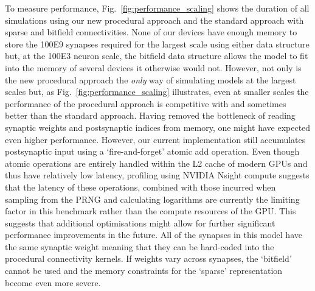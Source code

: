 \documentclass[9pt,a4paper]{amsart}
\begin{document}
To measure performance, Fig.~\ref{fig:performance_scaling} shows the duration of all simulations using our new procedural approach and the standard approach with sparse and bitfield connectivities. 
None of our devices have enough memory to store the \num{100E9} synapses required for the largest scale using either data structure but, at the \num{100E3} neuron scale, the bitfield data structure allows the model to fit into the memory of several devices it otherwise would not.
However, not only is the new procedural approach the \emph{only} way of simulating models at the largest scales but, as Fig.~\ref{fig:performance_scaling} illustrates, even at smaller scales the performance of the procedural approach is competitive with and sometimes better than the standard approach.
Having removed the bottleneck of reading synaptic weights and postsynaptic indices from memory, one might have expected even higher performance. 
However, our current implementation still accumulates postsynaptic input using a `fire-and-forget' atomic add operation.
Even though atomic operations are entirely handled within the L2 cache of modern GPUs and thus have relatively low latency, profiling using NVIDIA Nsight compute suggests that the latency of these operations, combined with those incurred when sampling from the PRNG and calculating logarithms are currently the limiting factor in this benchmark rather than the compute resources of the GPU. This suggests that additional optimisations might allow for further significant performance improvements in the future.
All of the synapses in this model have the same synaptic weight meaning that they can be hard-coded into the procedural connectivity kernels.
If weights vary across synapses, the `bitfield' cannot be used and the memory constraints for the `sparse' representation become even more severe.
\end{document}
